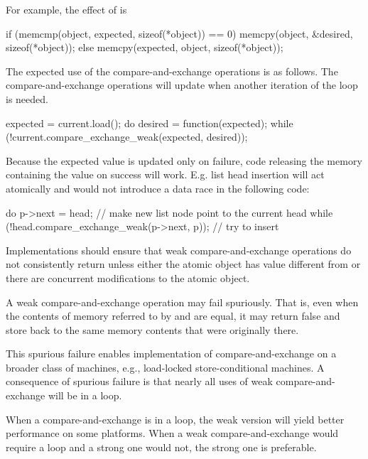 \begin{itemdescr}
\pnum
\begin{note} For example, the effect of
 is
\begin{codeblock}
if (memcmp(object, expected, sizeof(*object)) == 0)
  memcpy(object, &desired, sizeof(*object));
else
  memcpy(expected, object, sizeof(*object));
\end{codeblock}
\end{note}
\begin{example} The expected use of the compare-and-exchange operations is as follows. The
compare-and-exchange operations will update  when another iteration of
the loop is needed.
\begin{codeblock}
expected = current.load();
do {
  desired = function(expected);
} while (!current.compare_exchange_weak(expected, desired));
\end{codeblock}
\end{example}
\begin{example} Because the expected value is updated only on failure,
code releasing the memory containing the  value on success will work.
E.g. list head insertion will act atomically and would not introduce a
data race in the following code:
\begin{codeblock}
do {
  p->next = head; // make new list node point to the current head
} while (!head.compare_exchange_weak(p->next, p)); // try to insert
\end{codeblock}
\end{example}

\pnum
Implementations should ensure that weak compare-and-exchange operations do not
consistently return  unless either the atomic object has value
different from  or there are concurrent modifications to the
atomic object.

\pnum
\remark
A weak compare-and-exchange operation may fail spuriously. That is, even when
the contents of memory referred to by  and  are
equal, it may return false and store back to  the same memory
contents that were originally there.
\begin{note} This
spurious failure enables implementation of compare-and-exchange on a broader class of
machines, e.g., load-locked store-conditional machines. A
consequence of spurious failure is that nearly all uses of weak compare-and-exchange
will be in a loop.

When a compare-and-exchange is in a loop, the weak version will yield better performance
on some platforms. When a weak compare-and-exchange would require a loop and a strong one
would not, the strong one is preferable.
\end{note}


\end{itemdescr}
